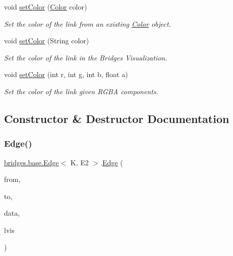 \begin{DoxyCompactItemize}
void \hyperlink{classbridges_1_1base_1_1_edge_a77f6d36e94a3cbb8e478c85a1a6dad84}{set\+Color} (\hyperlink{classbridges_1_1base_1_1_color}{Color} color)
\begin{DoxyCompactList}\small\item\em Set the color of the link from an existing \hyperlink{classbridges_1_1base_1_1_color}{Color} object. \end{DoxyCompactList}\item 
void \hyperlink{classbridges_1_1base_1_1_edge_adc2dbd9f8d74f8749ba64515ca052909}{set\+Color} (String color)
\begin{DoxyCompactList}\small\item\em Set the color of the link in the Bridges Visualization. \end{DoxyCompactList}\item 
void \hyperlink{classbridges_1_1base_1_1_edge_a4ecf6bdaf140202b41c8a929fbdcdc0c}{set\+Color} (int r, int g, int b, float a)
\begin{DoxyCompactList}\small\item\em Set the color of the link given R\+G\+BA components. \end{DoxyCompactList}\end{DoxyCompactItemize}


\subsection{Constructor \& Destructor Documentation}
\mbox{\label{classbridges_1_1base_1_1_edge_a2a17f458612fbcee8e9efb8d91a6cc18}} 
\subsubsection{\texorpdfstring{Edge()}{Edge()}\hspace{0.1cm}{\footnotesize\ttfamily [1/2]}}
{\footnotesize\ttfamily \hyperlink{classbridges_1_1base_1_1_edge}{bridges.\+base.\+Edge}$<$ K, E2 $>$.\hyperlink{classbridges_1_1base_1_1_edge}{Edge} (\begin{DoxyParamCaption}\item[{K}]{from,  }\item[{K}]{to,  }\item[{E2}]{data,  }\item[{\hyperlink{classbridges_1_1base_1_1_link_visualizer}{Link\+Visualizer}}]{lvis }\end{DoxyParamCaption})}




